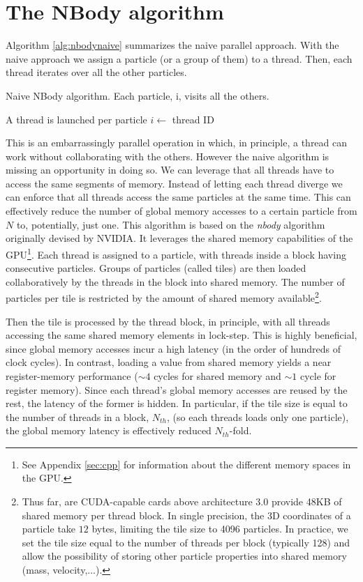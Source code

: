\documentclass[ twoside,openright,titlepage,numbers=noenddot,%
headinclude,footinclude,cleardoublepage=empty,abstract=on,
BCOR=5mm,paper=b5,fontsize=11pt, dvipsnames
]{scrreprt}
\newcommand{\gpu}{\gls{GPU}\xspace}
\begin{document}
\section{The NBody algorithm}
Algorithm \ref{alg:nbodynaive} summarizes the naive parallel approach. With the naive approach we assign a particle (or a group of them) to a thread. Then, each thread iterates over all the other particles.
\begin{algorithm}[H]
  \caption{Naive NBody algorithm. Each particle, i, visits all the others.}\label{alg:nbodynaive}
  \begin{algorithmic}[1]
    \Require A thread is launched per particle    
    \State $i \gets$ thread ID 
    \EndFor
  \end{algorithmic}
\end{algorithm}
This is an embarrassingly parallel operation in which, in principle, a thread can work without collaborating with the others. However the naive algorithm is missing an opportunity in doing so. We can leverage that all threads have to access the same segments of memory. Instead of letting each thread diverge we can enforce that all threads access the same particles at the same time. This can effectively reduce the number of global memory accesses to a certain particle from $N$ to, potentially, just one.
This algorithm is based on the \emph{nbody} algorithm originally devised by NVIDIA\cite{Nguyen2008,Wilt2013}. It leverages the shared memory capabilities of the \gpu\footnote{See Appendix \ref{sec:cpp} for information about the different memory spaces in the \gpu.}.
Each thread is assigned to a particle, with threads inside a block having consecutive particles.
Groups of particles (called tiles) are then loaded collaboratively by the threads in the block into shared memory.
The number of particles per tile is restricted by the amount of shared memory available\footnote{Thus far, are CUDA-capable cards above architecture 3.0 provide 48KB of shared memory per thread block. In single precision, the 3D coordinates of a particle take $12$ bytes, limiting the tile size to 4096 particles. In practice, we set the tile size equal to the number of threads per block (typically 128) and allow the possibility of storing other particle properties into shared memory (mass, velocity,...).}.

Then the tile is processed by the thread block, in principle, with all threads accessing the same shared memory elements in lock-step.
This is highly beneficial, since global memory accesses incur a high latency (in the order of hundreds of clock cycles). In contrast, loading a value from shared memory yields a near register-memory performance ($\sim 4$ cycles for shared memory and $\sim 1$ cycle for register memory). Since each thread's global memory accesses are reused by the rest, the latency of the former is hidden. In particular, if the tile size is equal to the number of threads in a block, $N_{th}$, (so each threads loads only one particle), the global memory latency is effectively reduced $N_{th}$-fold.
\end{document}
